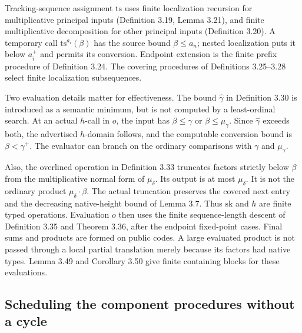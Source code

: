 \documentclass[11pt]{article}
\begin{document}
Tracking-sequence assignment $\mathrm{ts}$ uses finite localization
recursion for multiplicative principal inputs (Definition 3.19,
Lemma 3.21), and finite multiplicative decomposition for other
principal inputs (Definition 3.20). A temporary call
$\mathrm{ts}^{a_i}(\beta)$ has the source bound $\beta\le a_n$;
nested localization puts it below $a_i^+$ and permits its conversion.
Endpoint extension is the finite prefix procedure of Definition 3.24.
The covering procedures of Definitions 3.25--3.28 select finite
localization subsequences.

Two evaluation details matter for effectiveness. The bound
$\widehat\gamma$ in Definition 3.30 is introduced as a semantic
minimum, but is not computed by a least-ordinal search. At an actual
$h$-call in $o$, the input has $\beta\le\gamma$ or
$\beta\le\mu_\gamma$. Since $\widehat\gamma$ exceeds both, the
advertised $h$-domain follows, and the computable conversion bound
is $\beta<\gamma^+$. The evaluator can branch on the ordinary
comparisons with $\gamma$ and $\mu_\gamma$.

Also, the overlined operation in Definition 3.33 truncates factors
strictly below $\beta$ from the multiplicative normal form of
$\mu_\delta$. Its output is at most $\mu_\delta$. It is not the
ordinary product $\mu_\delta\cdot\beta$. The actual truncation
preserves the covered next entry and the decreasing native-height
bound of Lemma 3.7. Thus $\mathrm{sk}$ and $h$ are finite typed
operations. Evaluation $o$ then uses the finite sequence-length
descent of Definition 3.35 and Theorem 3.36, after the endpoint
fixed-point cases. Final sums and products are formed on public
codes. A large evaluated product is not passed through a local
partial translation merely because its factors had native types.
Lemma 3.49 and Corollary 3.50 give finite containing blocks for
these evaluations.

\subsection{Scheduling the component procedures without a cycle}
\end{document}
